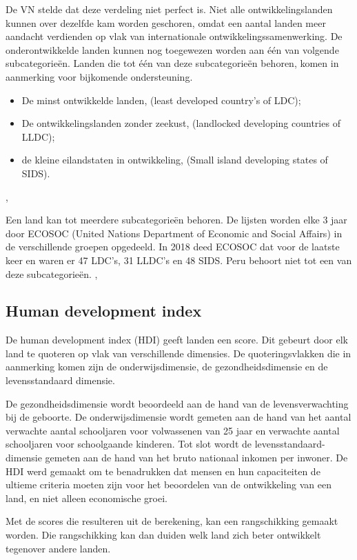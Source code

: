 De VN stelde dat deze verdeling niet perfect is. Niet alle ontwikkelingslanden kunnen over dezelfde kam worden geschoren, omdat een aantal landen meer aandacht verdienden op vlak van internationale ontwikkelingssamenwerking. De onderontwikkelde landen kunnen  nog toegewezen worden aan één van volgende subcategorieën. Landen die tot één van deze subcategorieën behoren, komen in aanmerking voor bijkomende ondersteuning.

\begin{itemize}
\item De minst ontwikkelde landen, (least developed country's of LDC);
\item De ontwikkelingslanden zonder zeekust, (landlocked developing countries of LLDC);
\item de kleine eilandstaten in ontwikkeling, (Small island developing states of SIDS).
\end{itemize}
\autocite{MarcJ.Bossuyt2005},

Een land kan tot meerdere subcategorieën behoren. De lijsten worden elke 3 jaar door ECOSOC (United Nations Department of Economic and Social Affairs) in de verschillende groepen opgedeeld. \autocite{ecosoc2018} In 2018 deed ECOSOC dat voor de laatste keer en waren er 47 LDC's, 31 LLDC's en 48 SIDS. Peru behoort niet tot een van deze subcategorieën. \autocite{MarcJ.Bossuyt2005},

\subsection{Human development index}
De human development index (HDI) geeft landen een score. Dit gebeurt door elk land te quoteren op vlak van verschillende dimensies. De quoteringsvlakken die in aanmerking komen zijn de onderwijsdimensie, de gezondheidsdimensie en de levensstandaard dimensie. \autocite{UNDP2019}

De gezondheidsdimensie wordt beoordeeld aan de hand van de levensverwachting bij de geboorte. De onderwijsdimensie wordt gemeten aan de hand van het aantal verwachte aantal schooljaren voor volwassenen van 25 jaar en verwachte aantal schooljaren voor schoolgaande kinderen. Tot slot wordt de levensstandaard-dimensie gemeten aan de hand van het bruto nationaal inkomen per inwoner. De HDI werd gemaakt om te benadrukken dat mensen en hun capaciteiten de ultieme criteria moeten zijn voor het beoordelen van de ontwikkeling van een land, en niet alleen economische groei. \autocite{UNDP2019}

Met de scores die resulteren uit de berekening, kan een rangschikking gemaakt worden. Die rangschikking kan dan duiden welk land zich beter ontwikkelt tegenover andere landen. 

